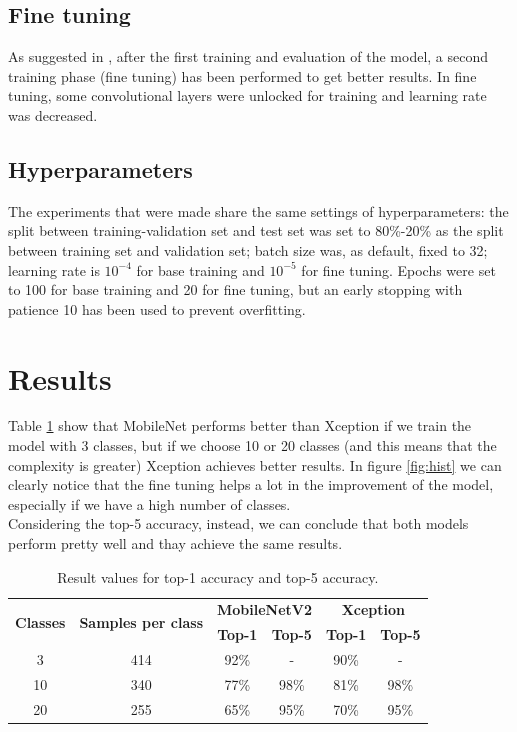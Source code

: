 \documentclass[12pt]{llncs}
\begin{document}
\subsection{Fine tuning}
As suggested in \cite{tf-transfer}, after the first training and evaluation of the model, a second training phase (fine tuning) has been performed to get better results. In fine tuning, some convolutional layers were unlocked for training and learning rate was decreased.

\subsection{Hyperparameters}
The experiments that were made share the same settings of hyperparameters: the split between training-validation set and test set was set to 80\%-20\% as the split between training set and validation set; batch size was, as default, fixed to 32; learning rate is $10^{-4}$ for base training and $10^{-5}$ for fine tuning. Epochs were set to 100 for base training and 20 for fine tuning, but an early stopping with patience 10 has been used to prevent overfitting.

\section{Results}
Table \ref{tab:accuracy} show that MobileNet performs better than Xception if we train the model with 3 classes, but if we choose 10 or 20 classes (and this means that the complexity is greater) Xception achieves better results. In figure \ref{fig:hist} we can clearly notice that the fine tuning helps a lot in the improvement of the model, especially if we have a high number of classes.\\
Considering the top-5 accuracy, instead, we can conclude that both models perform pretty well and thay achieve the same results.

\begin{table}[h]
\centering
\setlength{\tabcolsep}{5pt}
\def\arraystretch{1.2}
\begin{tabular}{ |c|c|c|c|c|c| } 
 \hline
 \multirow{2}{4em}{\textbf{Classes}} & \multirow{2}{6em}{\textbf{Samples per class}} & \multicolumn{2}{|c|}{\textbf{MobileNetV2}} & \multicolumn{2}{|c|}{\textbf{Xception}} \\ 
 \cline{3-6}
 & & \textbf{Top-1} & \textbf{Top-5} & \textbf{Top-1} & \textbf{Top-5} \\
 \hline 
 3 & 414 & 92\% & - & 90\% & - \\ 
 \hline 
 10 & 340 & 77\% & 98\% & 81\% & 98\% \\
 \hline 
 20 & 255 & 65\% & 95\% & 70\% & 95\% \\
 \hline
\end{tabular}
\caption{Result values for top-1 accuracy and top-5 accuracy.}
\label{tab:accuracy}
\end{table}
\end{document}
